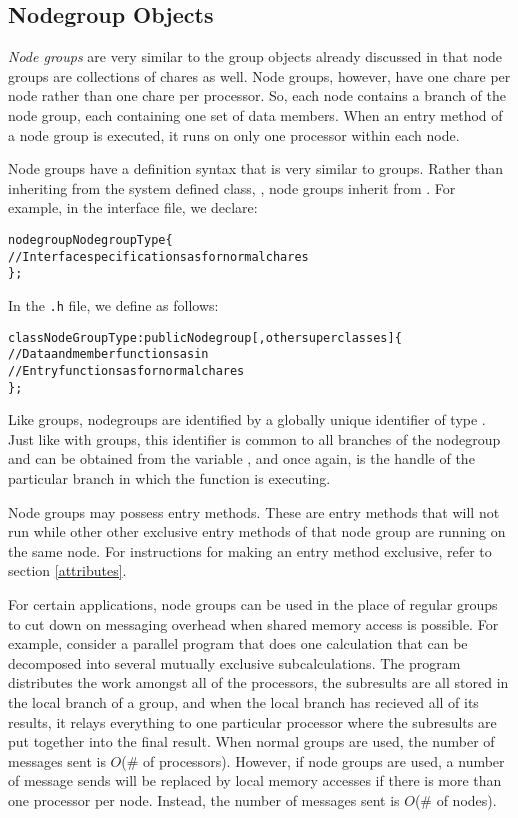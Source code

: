 \subsection{Nodegroup Objects}

{\it Node groups}   are very
similar to the group objects already discussed in that node groups are
collections of chares as well.  Node groups, however, have one chare per node
rather than one chare per processor.  So, each node contains a branch of the
node group, each containing one set of data members.  When an entry method of a
node group is executed, it runs on only one processor within each node.

Node groups have a definition syntax that is very similar to groups.  Rather
than inheriting from the system defined class, , node groups inherit
from .  For example, in the interface file, we declare:

\begin{alltt}
 nodegroup NodegroupType \{
  // Interface specifications as for normal chares
 \};
\end{alltt}

In the {\tt .h} file, we define  as follows:

\begin{alltt}
 class NodeGroupType : public Nodegroup [,other superclasses ] \{
  // Data and member functions as in \CC{}
  // Entry functions as for normal chares
 \};
\end{alltt}

Like groups, nodegroups are identified by a globally unique identifier of type
.  Just like with groups, this identifier is
common to all branches of the nodegroup and can be obtained from the variable
, and once again, 
 is the handle of the particular branch in which the function is
executing.

Node groups may possess  entry methods.  These
are entry methods that will not run while other other exclusive entry methods
of that node group are running on the same node.  For instructions for making
an entry method exclusive, refer to section \ref{attributes}.

For certain applications, node groups can be used in the place of regular
groups to cut down on messaging overhead when shared memory access is possible.
For example, consider a parallel program that does one calculation that can be
decomposed into several mutually exclusive subcalculations.  The program
distributes the work amongst all of the processors, the subresults are all
stored in the local branch of a group, and when the local branch has recieved
all of its results, it relays everything to one particular processor where the
subresults are put together into the final result.  When normal groups are
used, the number of messages sent is $O$(\# of processors).  However, if node
groups are used, a number of message sends will be replaced by local memory
accesses if there is more than one processor per node.  Instead, the number of
messages sent is $O$(\# of nodes).

